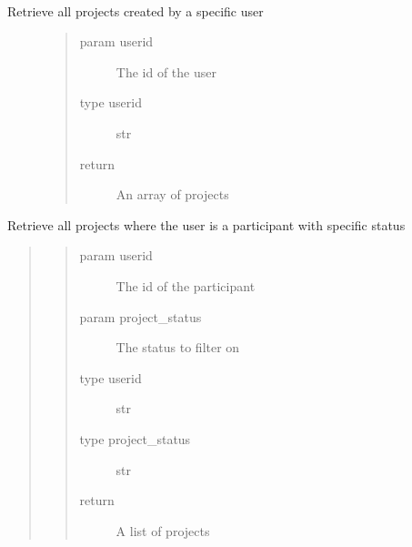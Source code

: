 \documentclass[letterpaper,10pt,english]{sphinxmanual}
\begin{document}
\begin{fulllineitems}
\label{\detokenize{index:models.project.get_projects_by_owner}}~\begin{description}
\item[{Retrieve all projects created by a specific user}] \leavevmode\begin{quote}\begin{description}
\item[{param userid}] \leavevmode
The id of the user

\item[{type userid}] \leavevmode
str

\item[{return}] \leavevmode
An array of projects

\end{description}\end{quote}

\end{description}

\end{fulllineitems}


\begin{fulllineitems}
\label{\detokenize{index:models.project.get_projects_by_participant_and_status}}
Retrieve all projects where the user is a participant with specific status
\begin{quote}
\begin{quote}\begin{description}
\item[{param userid}] \leavevmode
The id of the participant

\item[{param project\_status}] \leavevmode
The status to filter on

\item[{type userid}] \leavevmode
str

\item[{type project\_status}] \leavevmode
str

\item[{return}] \leavevmode
A list of projects

\end{description}\end{quote}
\end{quote}

\end{fulllineitems}
\end{document}
